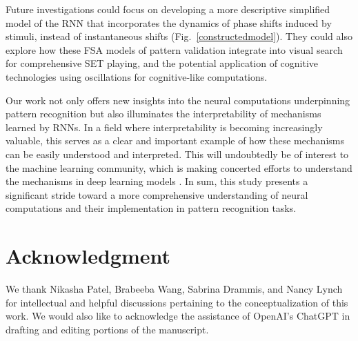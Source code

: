 \documentclass[conference]{IEEEtran}
\begin{document}
Future investigations could focus on developing a more descriptive simplified model of the RNN that incorporates the dynamics of phase shifts induced by stimuli, instead of instantaneous shifts (Fig.~\ref{constructedmodel}). They could also explore how these FSA models of pattern validation integrate into visual search for comprehensive SET playing, and the potential application of cognitive technologies using oscillations for cognitive-like computations.

Our work not only offers new insights into the neural computations underpinning pattern recognition but also illuminates the interpretability of mechanisms learned by RNNs. In a field where interpretability is becoming increasingly valuable, this serves as a clear and important example of how these mechanisms can be easily understood and interpreted. This will undoubtedly be of interest to the machine learning community, which is making concerted efforts to understand the mechanisms in deep learning models \cite{nanda2023progress}. In sum, this study presents a significant stride toward a more comprehensive understanding of neural computations and their implementation in pattern recognition tasks.

\section*{Acknowledgment}

We thank Nikasha Patel, Brabeeba Wang, Sabrina Drammis, and Nancy Lynch for intellectual and helpful discussions pertaining to the conceptualization of this work. We would also like to acknowledge the assistance of OpenAI's ChatGPT in drafting and editing portions of the manuscript.
\end{document}
